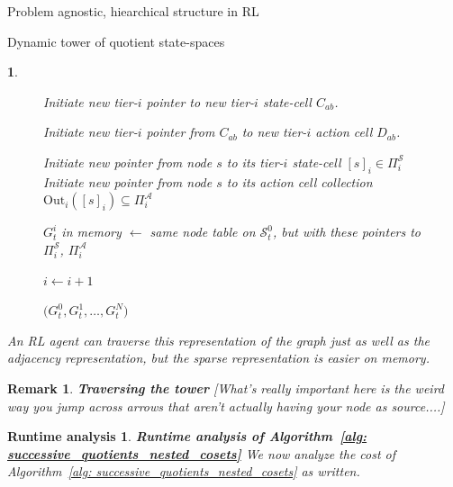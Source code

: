 \documentclass[11pt]{article}
\newtheorem{remark}[subsubsection]{Remark}
\newtheorem{ermark}[subsubsection]{}
\newtheorem{run_analysis}[subsubsection]{Runtime analysis}
\begin{document}
\begin{section}{Problem agnostic, hiearchical structure in RL}
\begin{subsection}{Dynamic tower of quotient state-spaces}
\begin{ermark}
\begin{figure}[!h]
\begin{algorithm}[H]
\begin{algorithmic}[1]

                \State Initiate new tier-$i$ pointer to new tier-$i$ state-cell $C_{ab}$.

                \State Initiate new tier-$i$ pointer from $C_{ab}$ to new tier-$i$ action cell $D_{ab}$.
                \EndFor
            \EndIf
        \EndFor

            \State Initiate new pointer from node $s$  to its tier-$i$ state-cell $[s]_i\in\Pi_i^{\mathcal S}$
            \State Initiate new pointer from node $s$  to its action cell collection $\mathrm{Out}_i([s]_i)\subseteq\Pi_i^{\mathcal A}$
        \EndFor

        \State $G_t^i$ in memory $\gets$ same node table on $\mathcal{S}_t^0$, but with these pointers to $\Pi_i^{\mathcal S}$, $\Pi_i^{\mathcal A}$

        \State $i \gets i+1$

    \EndWhile

    \State \Return $\bigl(
    G_t^0,G_t^1,\dots,G_t^N
    \bigr)$
\EndFunction

\end{algorithmic}
\end{algorithm}
    \label{fig: algorithm 1}
\end{figure}

An RL agent can traverse this representation of the graph just as well as the adjacency representation, but the sparse representation is easier on memory.
\end{ermark}

\begin{remark}
{\bf Traversing the tower}
\normalfont
{\color{blue} [What's really important here is the weird way you jump across arrows that aren't actually having your node as source....]}
\end{remark}

\begin{run_analysis}
{\bf Runtime analysis of Algorithm~\ref{alg: successive_quotients_nested_cosets}}
\normalfont
We now analyze the cost of Algorithm~\ref{alg: successive_quotients_nested_cosets} as written.


\end{run_analysis}
\end{subsection}
\end{section}
\end{document}
